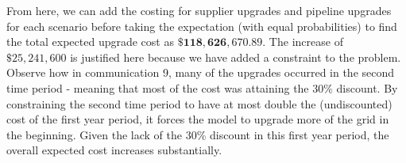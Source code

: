 \documentclass{article}
\begin{document}
\renewcommand\baselinestretch{1}
\bigskip
\noindent
From here, we can add the costing for supplier upgrades and pipeline upgrades for each scenario before taking the expectation (with equal probabilities) to find the total expected upgrade cost as \(\boldsymbol{\$118,626,670.89}\). The increase of \(\$25,241,600\) is justified here because we have added a constraint to the problem. Observe how in communication 9, many of the upgrades occurred in the second time period - meaning that most of the cost was attaining the \(30\%\) discount. By constraining the second time period to have at most double the (undiscounted) cost of the first year period, it forces the model to upgrade more of the grid in the beginning. Given the lack of the 30\% discount in this first year period, the overall expected cost increases substantially.

\newpage
\end{document}

